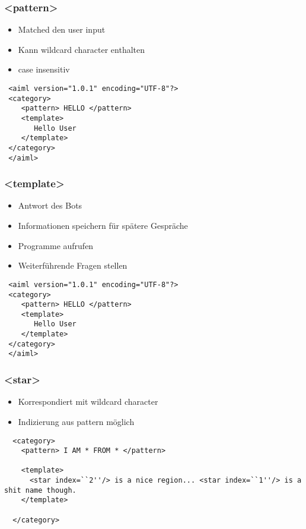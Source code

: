 \documentclass[9pt]{beamer}
\begin{document}
\begin{frame}[fragile]
  \frametitle{\textless pattern\textgreater}  %
\begin{itemize}
  \item Matched den user input\\
  \item Kann wildcard character enthalten\\
  \item case insensitiv\\
  \end{itemize}
  \begin{lstlisting}
 <aiml version="1.0.1" encoding="UTF-8"?> 
 <category> 
    <pattern> HELLO </pattern> 
    <template>  
       Hello User
    </template> 
 </category> 
 </aiml> 
  \end{lstlisting}
\end{frame}


\begin{frame}[fragile]
  \frametitle{\textless template\textgreater}
\begin{itemize}
  \item Antwort des Bots\\
  \item Informationen speichern für spätere Gespräche\\
  \item Programme aufrufen\\
  \item Weiterführende Fragen stellen\\
  \end{itemize}
  \begin{lstlisting}
 <aiml version="1.0.1" encoding="UTF-8"?> 
 <category> 
    <pattern> HELLO </pattern> 
    <template>  
       Hello User
    </template> 
 </category> 
 </aiml> 
  \end{lstlisting}
\end{frame}

\begin{frame}[fragile]
  \frametitle{\textless star\textgreater}
\begin{itemize}
  \item Korrespondiert mit wildcard character\\
  \item Indizierung aus pattern möglich
  \end{itemize}

  \begin{lstlisting}
  <category>
    <pattern> I AM * FROM * </pattern>

    <template>
      <star index=``2''/> is a nice region... <star index=``1''/> is a shit name though.
    </template>

  </category>
  \end{lstlisting}
\end{frame}
\end{document}
